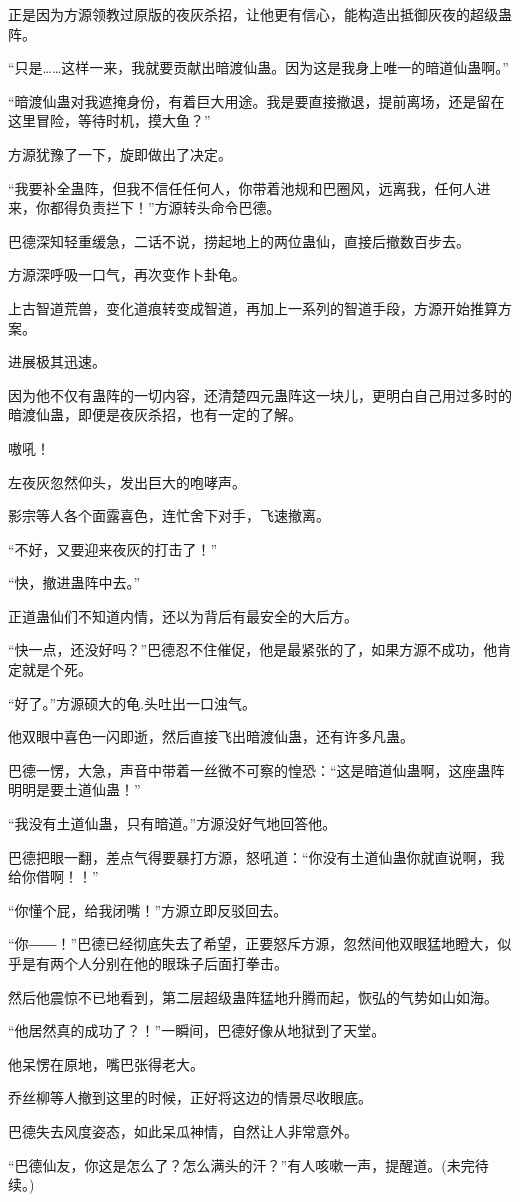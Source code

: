 \begin{this_body}
正是因为方源领教过原版的夜灰杀招，让他更有信心，能构造出抵御灰夜的超级蛊阵。

“只是……这样一来，我就要贡献出暗渡仙蛊。因为这是我身上唯一的暗道仙蛊啊。”

“暗渡仙蛊对我遮掩身份，有着巨大用途。我是要直接撤退，提前离场，还是留在这里冒险，等待时机，摸大鱼？”

方源犹豫了一下，旋即做出了决定。

“我要补全蛊阵，但我不信任任何人，你带着池规和巴圈风，远离我，任何人进来，你都得负责拦下！”方源转头命令巴德。

巴德深知轻重缓急，二话不说，捞起地上的两位蛊仙，直接后撤数百步去。

方源深呼吸一口气，再次变作卜卦龟。

上古智道荒兽，变化道痕转变成智道，再加上一系列的智道手段，方源开始推算方案。

进展极其迅速。

因为他不仅有蛊阵的一切内容，还清楚四元蛊阵这一块儿，更明白自己用过多时的暗渡仙蛊，即便是夜灰杀招，也有一定的了解。

嗷吼！

左夜灰忽然仰头，发出巨大的咆哮声。

影宗等人各个面露喜色，连忙舍下对手，飞速撤离。

“不好，又要迎来夜灰的打击了！”

“快，撤进蛊阵中去。”

正道蛊仙们不知道内情，还以为背后有最安全的大后方。

“快一点，还没好吗？”巴德忍不住催促，他是最紧张的了，如果方源不成功，他肯定就是个死。

“好了。”方源硕大的龟.头吐出一口浊气。

他双眼中喜色一闪即逝，然后直接飞出暗渡仙蛊，还有许多凡蛊。

巴德一愣，大急，声音中带着一丝微不可察的惶恐：“这是暗道仙蛊啊，这座蛊阵明明是要土道仙蛊！”

“我没有土道仙蛊，只有暗道。”方源没好气地回答他。

巴德把眼一翻，差点气得要暴打方源，怒吼道：“你没有土道仙蛊你就直说啊，我给你借啊！！”

“你懂个屁，给我闭嘴！”方源立即反驳回去。

“你――！”巴德已经彻底失去了希望，正要怒斥方源，忽然间他双眼猛地瞪大，似乎是有两个人分别在他的眼珠子后面打拳击。

然后他震惊不已地看到，第二层超级蛊阵猛地升腾而起，恢弘的气势如山如海。

“他居然真的成功了？！”一瞬间，巴德好像从地狱到了天堂。

他呆愣在原地，嘴巴张得老大。

乔丝柳等人撤到这里的时候，正好将这边的情景尽收眼底。

巴德失去风度姿态，如此呆瓜神情，自然让人非常意外。

“巴德仙友，你这是怎么了？怎么满头的汗？”有人咳嗽一声，提醒道。(未完待续。)

\end{this_body}

